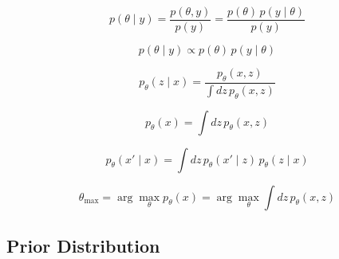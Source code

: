 \documentclass[ %
                    author={Revalda Putawara},
                supervisor={Dr. James Pope},
                    degree={MSc},
                     title={Robustness of Bayesian Neural Networks Design Choices Against Weight and Bias Perturbation Induced by Single Event Upsets (SEUs)},
                      type={},
                      year={2025}]{dissertation}
\begin{document}
\noindent
\begin{minipage}{0.48\linewidth}
\begin{equation}
p(\theta \mid y) = \frac{p(\theta, y)}{p(y)} 
= \frac{p(\theta)\,p(y \mid \theta)}{p(y)}
\label{eq:book_1.1}
\end{equation}
\end{minipage}\hfill
\begin{minipage}{0.48\linewidth}
\begin{equation}
p(\theta \mid y) \propto p(\theta)\,p(y \mid \theta)
\label{eq:book_1.2}
\end{equation}
\end{minipage}

\vspace{1em}

\noindent
\begin{minipage}{0.48\linewidth}
\begin{equation}
p_\theta(z \mid x) = \frac{p_\theta(x,z)}{\int dz\, p_\theta(x,z)}
\label{eq:posteriorlatent}
\end{equation}
\end{minipage}\hfill
\begin{minipage}{0.48\linewidth}
\begin{equation}
p_\theta(x) = \int dz\, p_\theta(x,z)
\label{eq:marginallikelihood}
\end{equation}
\end{minipage}

\vspace{1em}

\noindent
\begin{minipage}{0.48\linewidth}
\begin{equation}
p_\theta(x' \mid x) = \int dz\, p_\theta(x' \mid z)\, p_\theta(z \mid x)
\label{eq:posteriorpredictivedistribution}
\end{equation}
\end{minipage}\hfill
\begin{minipage}{0.48\linewidth}
\begin{equation}
\theta_{\max} = \arg\max_\theta p_\theta(x) 
= \arg\max_\theta \int dz\, p_\theta(x,z)
\label{eq:thetamle}
\end{equation}
\end{minipage}


\subsection{Prior Distribution} \label{section:backgroundpriordist}
\end{document}
